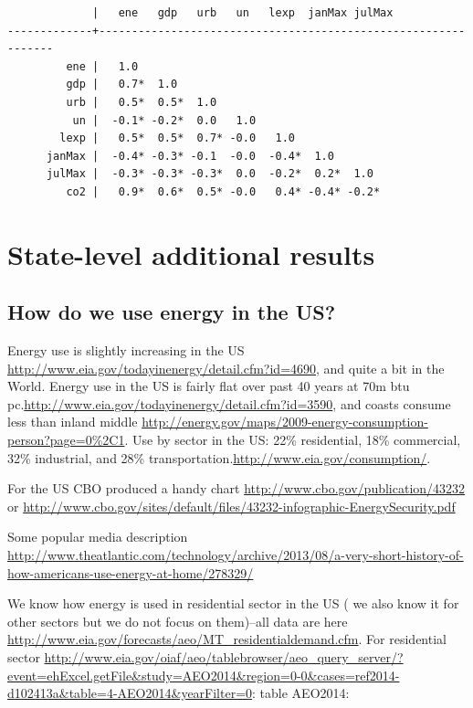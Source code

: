\documentclass[10pt, letterpaper]{article}
\begin{document}
\begin{spacing}{1.4}
\begin{verbatim}
             |   ene   gdp   urb   un   lexp  janMax julMax
-------------+---------------------------------------------------------------
         ene |   1.0 
         gdp |   0.7*  1.0 
         urb |   0.5*  0.5*  1.0 
          un |  -0.1* -0.2*  0.0   1.0 
        lexp |   0.5*  0.5*  0.7* -0.0   1.0 
      janMax |  -0.4* -0.3* -0.1  -0.0  -0.4*  1.0 
      julMax |  -0.3* -0.3* -0.3*  0.0  -0.2*  0.2*  1.0 
         co2 |   0.9*  0.6*  0.5* -0.0   0.4* -0.4* -0.2*

\end{verbatim}

\section{State-level additional results}
\subsection{How do we use energy in the US?}

Energy use is slightly increasing in the US
\url{http://www.eia.gov/todayinenergy/detail.cfm?id=4690}, and quite a bit in
the World. 
Energy use in the US is fairly flat over past 40 years at 70m btu
pc.\url{http://www.eia.gov/todayinenergy/detail.cfm?id=3590}, and coasts consume
less than inland middle
\url{http://energy.gov/maps/2009-energy-consumption-person?page=0%2C1}. 
Use by sector in the US: 22\% residential, 18\% commercial, 32\% industrial, and
28\% transportation.\url{http://www.eia.gov/consumption/}. 


For the US CBO produced a handy chart \url{http://www.cbo.gov/publication/43232} or \url{http://www.cbo.gov/sites/default/files/43232-infographic-EnergySecurity.pdf}

Some popular media description
\url{http://www.theatlantic.com/technology/archive/2013/08/a-very-short-history-of-how-americans-use-energy-at-home/278329/}

We know how energy is used in residential sector in the US ( we also know it for
other sectors but we do not focus on them)--all data are here
\url{http://www.eia.gov/forecasts/aeo/MT_residentialdemand.cfm}. For residential
sector
\url{http://www.eia.gov/oiaf/aeo/tablebrowser/aeo_query_server/?event=ehExcel.getFile&study=AEO2014&region=0-0&cases=ref2014-d102413a&table=4-AEO2014&yearFilter=0}:
table AEO2014: 



\end{spacing}
\end{document}
